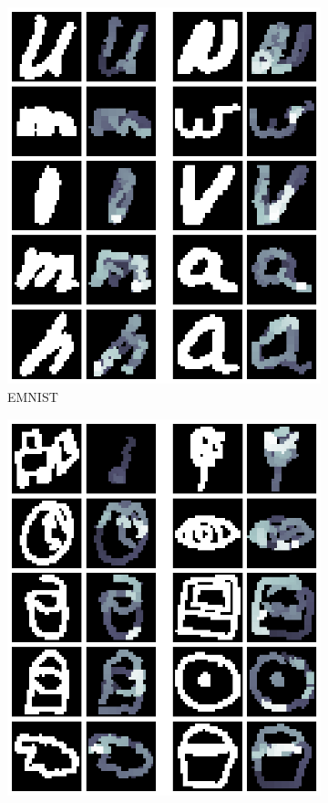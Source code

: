 \begin{figure}[!ht]
\begin{subfigure}[b]{0.3\textwidth}
        \includegraphics[width=\textwidth]{images/resultate/base-base-emnist.png}
        \caption{EMNIST}
    \end{subfigure}
    \begin{subfigure}[b]{0.3\textwidth}
        \centering
        \includegraphics[width=\textwidth]{images/resultate/base-base-quickdraw.png}

\end{subfigure}
\end{figure}
